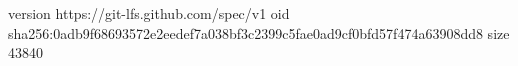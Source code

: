 version https://git-lfs.github.com/spec/v1
oid sha256:0adb9f68693572e2eedef7a038bf3c2399c5fae0ad9cf0bfd57f474a63908dd8
size 43840
